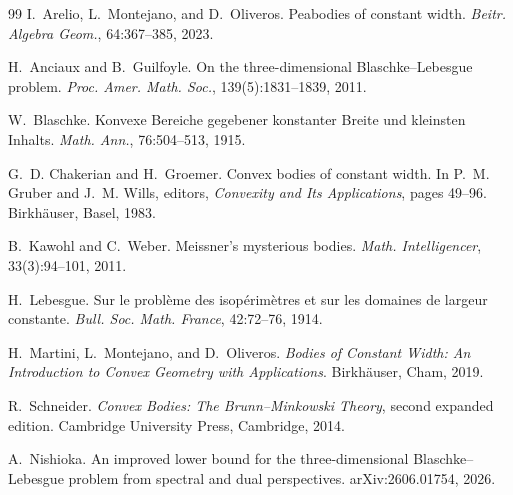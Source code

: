 \documentclass[11pt]{article}
\numberwithin{equation}{section}
\theoremstyle{remark}
\begin{document}
\begin{thebibliography}{99}
I.~Arelio, L.~Montejano, and D.~Oliveros.
\newblock Peabodies of constant width.
\newblock \emph{Beitr. Algebra Geom.}, 64:367--385, 2023.

H.~Anciaux and B.~Guilfoyle.
\newblock On the three-dimensional Blaschke--Lebesgue problem.
\newblock \emph{Proc. Amer. Math. Soc.}, 139(5):1831--1839, 2011.

W.~Blaschke.
\newblock Konvexe Bereiche gegebener konstanter Breite und kleinsten Inhalts.
\newblock \emph{Math. Ann.}, 76:504--513, 1915.

G.~D. Chakerian and H.~Groemer.
\newblock Convex bodies of constant width.
\newblock In P.~M. Gruber and J.~M. Wills, editors, \emph{Convexity and Its Applications}, pages 49--96. Birkh\"auser, Basel, 1983.

B.~Kawohl and C.~Weber.
\newblock Meissner's mysterious bodies.
\newblock \emph{Math. Intelligencer}, 33(3):94--101, 2011.

H.~Lebesgue.
\newblock Sur le probl\`eme des isop\'erim\`etres et sur les domaines de largeur constante.
\newblock \emph{Bull. Soc. Math. France}, 42:72--76, 1914.

H.~Martini, L.~Montejano, and D.~Oliveros.
\newblock \emph{Bodies of Constant Width: An Introduction to Convex Geometry with Applications}.
\newblock Birkh\"auser, Cham, 2019.


R.~Schneider.
\newblock \emph{Convex Bodies: The Brunn--Minkowski Theory}, second expanded edition.
\newblock Cambridge University Press, Cambridge, 2014.

A.~Nishioka.
\newblock An improved lower bound for the three-dimensional Blaschke--Lebesgue problem from spectral and dual perspectives.
\newblock arXiv:2606.01754, 2026.
\end{thebibliography}
\end{document}
